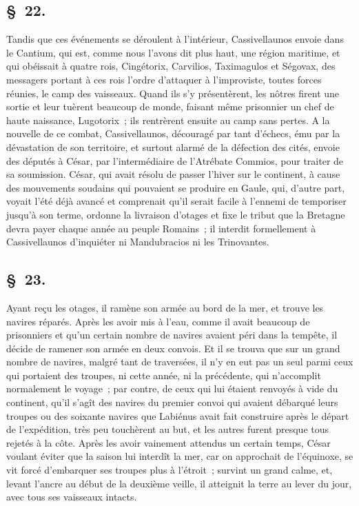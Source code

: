 \documentclass[french,twoside]{book} %
\begin{document}
\subsection[{§ 22.}]{ \textsc{§ 22.} }
\noindent Tandis que ces événements se déroulent à l’intérieur, Cassivellaunos envoie dans le Cantium, qui est, comme nous l’avons dit plus haut, une région maritime, et qui obéissait à quatre rois, Cingétorix, Carvilios, Taximagulos et Ségovax, des messagers portant à ces rois l’ordre d’attaquer à l’improviste, toutes forces réunies, le camp des vaisseaux. Quand ils s’y présentèrent, les nôtres firent une sortie et leur tuèrent beaucoup de monde, faisant même prisonnier un chef de haute naissance, Lugotorix ; ils rentrèrent ensuite au camp sans pertes. A la nouvelle de ce combat, Cassivellaunos, découragé par tant d’échecs, ému par la dévastation de son territoire, et surtout alarmé de la défection des cités, envoie des députés à César, par l’intermédiaire de l’Atrébate Commios, pour traiter de sa soumission. César, qui avait résolu de passer l’hiver sur le continent, à cause des mouvements soudains qui pouvaient se produire en Gaule, qui, d’autre part, voyait l’été déjà avancé et comprenait qu’il serait facile à l’ennemi de temporiser jusqu’à son terme, ordonne la livraison d’otages et fixe le tribut que la Bretagne devra payer chaque année au peuple Romains ; il interdit formellement à Cassivellaunos d’inquiéter ni Mandubracios ni les Trinovantes.
\subsection[{§ 23.}]{ \textsc{§ 23.} }
\noindent Ayant reçu les otages, il ramène son armée au bord de la mer, et trouve les navires réparés. Après les avoir mis à l’eau, comme il avait beaucoup de prisonniers et qu’un certain nombre de navires avaient péri dans la tempête, il décide de ramener son armée en deux convois. Et il se trouva que sur un grand nombre de navires, malgré tant de traversées, il n’y en eut pas un seul parmi ceux qui portaient des troupes, ni cette année, ni la précédente, qui n’accomplit normalement le voyage ; par contre, de ceux qui lui étaient renvoyés à vide du continent, qu’il s’agît des navires du premier convoi qui avaient débarqué leurs troupes ou des soixante navires que Labiénus avait fait construire après le départ de l’expédition, très peu touchèrent au but, et les autres furent presque tous rejetés à la côte. Après les avoir vainement attendus un certain temps, César voulant éviter que la saison lui interdît la mer, car on approchait de l’équinoxe, se vit forcé d’embarquer ses troupes plus à l’étroit ; survint un grand calme, et, levant l’ancre au début de la deuxième veille, il atteignit la terre au lever du jour, avec tous ses vaisseaux intacts.
\end{document}

